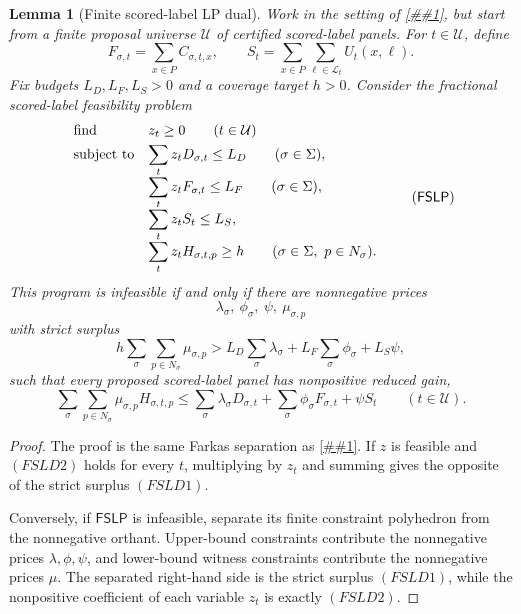 \documentclass[10pt]{article}
\newcommand{\cref}[1]{\ref{##1}}
\newtheorem{lemma}[theorem]{Lemma}
\theoremstyle{definition}
\begin{document}
\begin{lemma}[Finite scored-label LP dual]
   \label{lem:finite-scored-label-lp-dual}
   Work in the setting of \cref{prop:finite-retained-scored-label}, but start
   from a finite proposal universe \(\mathcal U\) of certified scored-label
   panels.  For \(t\in\mathcal U\), define
   \[
      F_{\sigma,t}=\sum_{x\in P}C_{\sigma,t,x},
      \qquad
      S_t=\sum_{x\in P}\sum_{\ell\in\mathcal L_t}U_t(x,\ell).
   \]
   Fix budgets \(L_D,L_F,L_S>0\) and a coverage target \(h>0\).  Consider the
   fractional scored-label feasibility problem
   \[
   \begin{array}{ll}
   \text{\rm find} & z_t\ge0\qquad(t\in\mathcal U)\\[0.3em]
   \text{\rm subject to}
      & \displaystyle \sum_tz_tD_{\sigma,t}\le L_D
        \qquad(\sigma\in\Sigma),\\[0.8em]
      & \displaystyle \sum_tz_tF_{\sigma,t}\le L_F
        \qquad(\sigma\in\Sigma),\\[0.8em]
      & \displaystyle \sum_tz_tS_t\le L_S,\\[0.8em]
      & \displaystyle \sum_tz_tH_{\sigma,t,p}\ge h
        \qquad(\sigma\in\Sigma,\ p\in N_\sigma).
   \end{array}
   \tag{\(\mathsf{FSLP}\)}
   \]
   This program is infeasible if and only if there are nonnegative prices
   \[
      \lambda_\sigma,\ \phi_\sigma,\ \psi,\ \mu_{\sigma,p}
   \]
   with strict surplus
   \[
      h\sum_{\sigma}\sum_{p\in N_\sigma}\mu_{\sigma,p}
      >
      L_D\sum_\sigma\lambda_\sigma
      +
      L_F\sum_\sigma\phi_\sigma
      +
      L_S\psi,
      \tag{FSLD1}
   \]
   such that every proposed scored-label panel has nonpositive reduced gain,
   \[
      \sum_\sigma\sum_{p\in N_\sigma}
      \mu_{\sigma,p}H_{\sigma,t,p}
      \le
      \sum_\sigma\lambda_\sigma D_{\sigma,t}
      +
      \sum_\sigma\phi_\sigma F_{\sigma,t}
      +
      \psi S_t
      \qquad(t\in\mathcal U).
      \tag{FSLD2}
   \]
\end{lemma}

\begin{proof}
   The proof is the same Farkas separation as
   \cref{lem:finite-priced-pair-lp-dual}.  If \(z\) is feasible and
   \((FSLD2)\) holds for every \(t\), multiplying by \(z_t\) and summing gives
   the opposite of the strict surplus \((FSLD1)\).

   Conversely, if \(\mathsf{FSLP}\) is infeasible, separate its finite
   constraint polyhedron from the nonnegative orthant.  Upper-bound constraints
   contribute the nonnegative prices \(\lambda,\phi,\psi\), and lower-bound
   witness constraints contribute the nonnegative prices \(\mu\).  The
   separated right-hand side is the strict surplus \((FSLD1)\), while the
   nonpositive coefficient of each variable \(z_t\) is exactly \((FSLD2)\).
\end{proof}
\end{document}
